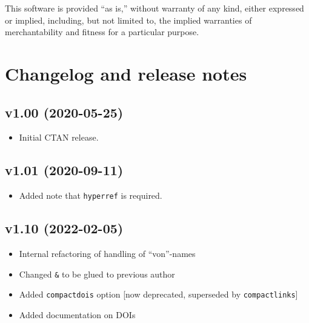 \documentclass[
]{article}
\providecommand{\tightlist}{%
  \setlength{\itemsep}{0pt}\setlength{\parskip}{0pt}}
\begin{document}
This software is provided ``as is,'' without warranty of any kind,
either expressed or implied, including, but not limited to, the implied
warranties of merchantability and fitness for a particular purpose.

\hypertarget{changelog-and-release-notes}{%
\section{Changelog and release
notes}\label{changelog-and-release-notes}}

\hypertarget{v1.00-2020-05-25}{%
\subsection*{v1.00 (2020-05-25)}\label{v1.00-2020-05-25}}

\begin{itemize}
\tightlist
\item
  Initial CTAN release.
\end{itemize}

\hypertarget{v1.01-2020-09-11}{%
\subsection*{v1.01 (2020-09-11)}\label{v1.01-2020-09-11}}

\begin{itemize}
\tightlist
\item
  Added note that \texttt{hyperref} is required.
\end{itemize}

\hypertarget{v1.10-2022-02-05}{%
\subsection*{v1.10 (2022-02-05)}\label{v1.10-2022-02-05}}

\begin{itemize}
\tightlist
\item
  Internal refactoring of handling of ``von''-names
\item
  Changed \texttt{\&} to be glued to previous author
\item
  Added \texttt{compactdois} option {[}now deprecated, superseded by
  \texttt{compactlinks}{]}
\item
  Added documentation on DOIs
\end{itemize}
\end{document}
